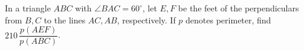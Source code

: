 In a triangle $ABC$ with $\angle BAC=60^\circ$, let $E,F$ be the feet of the perpendiculars from $B,C$ to the lines $AC,AB$, respectively. If $p$ denotes perimeter, find $210\,\dfrac{p(AEF)}{p(ABC)}$.
